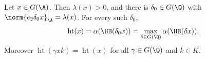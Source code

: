 Let $x\in G(\A)$. Then $\lambda(x)>0$, and there is $\delta_0\in G(\Q)$ with $\norm{e_2\delta_0x}_\A=\lambda(x)$. For every
such $\delta_0$,
\[
  \operatorname{ht}(x)=\alpha(\HB(\delta_0x))=\max_{\delta\in G(\Q)}\alpha(\HB(\delta x)).
\]
Moreover $\operatorname{ht}(\gamma xk)=\operatorname{ht}(x)$ for all $\gamma\in G(\Q)$ and $k\in K$.
